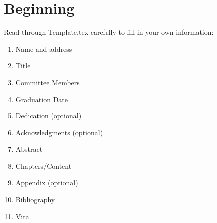 \chapter{Beginning}
Read through Template.tex carefully to fill in your own information:
\begin{enumerate}
\item Name and address 
\item Title
\item Committee Members
\item Graduation Date
\item Dedication (optional)
\item Acknowledgments (optional)
\item Abstract
\item Chapters/Content
\item Appendix (optional)
\item Bibliography
\item Vita
\end{enumerate}
